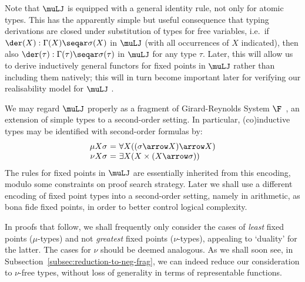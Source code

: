 \begin{remark}
    \label{rem:gen-identity+substitution}
    Note that $\muLJ$ is equipped with a general identity rule, not only for atomic types. 
    This has the apparently simple but useful consequence that typing derivations are closed under substitution of types for free variables, i.e.\ if $\der(X) : \Gamma(X) \seqar \sigma(X)$ in $\muLJ $ (with all occurrences of $X$ indicated), then also $\der(\tau) : \Gamma(\tau) \seqar \sigma(\tau)$ in $\muLJ$ for any type $\tau$.
    Later, this will allow us to derive inductively general functors for fixed points in $\muLJ$ rather than including them natively; this will in turn become important later for verifying our realisability model for $\muLJ$ .
\end{remark}

\begin{remark}
    \label{rem:mulj-frag-F}
    We may regard $\muLJ$ properly as a fragment of Girard-Reynolds System $\F$~\cite{girard1972systemF,Reynolds74systemF}, an extension of simple types to a second-order setting. 
    In particular, (co)inductive types may be identified with second-order formulas by:
    \[
    \begin{array}{r@{\ = \ }l}
         \mu X \sigma & \forall X ((\sigma \arrow X) \arrow X) \\
         \nu X \sigma & \exists X (X \times (X \arrow \sigma))
    \end{array}
    \]
    The rules for fixed points in $\muLJ$ are essentially inherited from this encoding, modulo some constraints on proof search strategy.
% 
    Later we shall use a different encoding of fixed point types into a second-order setting, namely in arithmetic, as bona fide fixed points, in order to better control logical complexity.
\end{remark}

In proofs that follow, we shall frequently only consider the cases of \emph{least} fixed points ($\mu$-types) and not \emph{greatest} fixed points ($\nu$-types), 
appealing to `duality' for the latter.
The cases for $\nu$ should be deemed analogous.
As we shall soon see, in Subsection~\ref{subsec:reduction-to-neg-frag}, we can indeed reduce our consideration to $\nu$-free types, without loss of generality in terms of representable functions.

